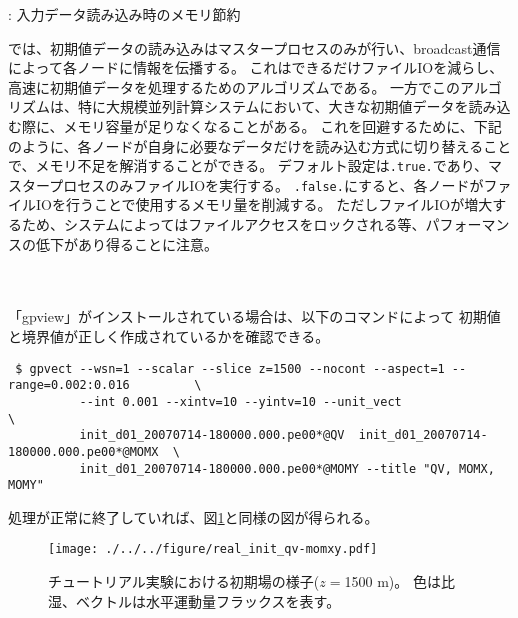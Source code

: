 \vspace{0.8cm}
: {\large 入力データ読み込み時のメモリ節約} \hrulefill

\scalerm では、初期値データの読み込みはマスタープロセスのみが行い、broadcast通信によって各ノードに情報を伝播する。
これはできるだけファイルIOを減らし、高速に初期値データを処理するためのアルゴリズムである。
一方でこのアルゴリズムは、特に大規模並列計算システムにおいて、大きな初期値データを読み込む際に、メモリ容量が足りなくなることがある。
これを回避するために、下記のように、各ノードが自身に必要なデータだけを読み込む方式に切り替えることで、メモリ不足を解消することができる。
%
デフォルト設定は\verb|.true.|であり、マスタープロセスのみファイルIOを実行する。
\verb|.false.|にすると、各ノードがファイルIOを行うことで使用するメモリ量を削減する。
ただしファイルIOが増大するため、システムによってはファイルアクセスをロックされる等、パフォーマンスの低下があり得ることに注意。

\noindent \hrulefill\\


\vspace{0.8cm}
 \hrulefill \\
「gpview」がインストールされている場合は、以下のコマンドによって
初期値と境界値が正しく作成されているかを確認できる。

\begin{verbatim}
 $ gpvect --wsn=1 --scalar --slice z=1500 --nocont --aspect=1 --range=0.002:0.016         \
          --int 0.001 --xintv=10 --yintv=10 --unit_vect                                   \
          init_d01_20070714-180000.000.pe00*@QV  init_d01_20070714-180000.000.pe00*@MOMX  \
          init_d01_20070714-180000.000.pe00*@MOMY --title "QV, MOMX, MOMY"
\end{verbatim}
処理が正常に終了していれば、図\ref{fig:init}と同様の図が得られる。

\begin{figure}[h]
\begin{center}
  \texttt{[image: ./../../figure/real\_init\_qv-momxy.pdf]}\\
  \caption{チュートリアル実験における初期場の様子($z=$1500 m)。
           色は比湿、ベクトルは水平運動量フラックスを表す。}
  \label{fig:init}
\end{center}
\end{figure}
